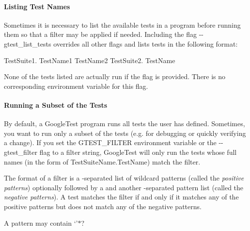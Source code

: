 \paragraph*{Listing Test Names}

Sometimes it is necessary to list the available tests in a program before running them so that a filter may be applied if needed. Including the flag {\ttfamily -\/-\/gtest\+\_\+list\+\_\+tests} overrides all other flags and lists tests in the following format\+:


\begin{DoxyCode}
TestSuite1.
  TestName1
  TestName2
TestSuite2.
  TestName
\end{DoxyCode}


None of the tests listed are actually run if the flag is provided. There is no corresponding environment variable for this flag.

\paragraph*{Running a Subset of the Tests}

By default, a Google\+Test program runs all tests the user has defined. Sometimes, you want to run only a subset of the tests (e.\+g. for debugging or quickly verifying a change). If you set the {\ttfamily G\+T\+E\+S\+T\+\_\+\+F\+I\+L\+T\+ER} environment variable or the {\ttfamily -\/-\/gtest\+\_\+filter} flag to a filter string, Google\+Test will only run the tests whose full names (in the form of {\ttfamily Test\+Suite\+Name.\+Test\+Name}) match the filter.

The format of a filter is a \textquotesingle{}{\ttfamily \+:}\textquotesingle{}-\/separated list of wildcard patterns (called the {\itshape positive patterns}) optionally followed by a \textquotesingle{}{\ttfamily -\/}\textquotesingle{} and another \textquotesingle{}{\ttfamily \+:}\textquotesingle{}-\/separated pattern list (called the {\itshape negative patterns}). A test matches the filter if and only if it matches any of the positive patterns but does not match any of the negative patterns.

A pattern may contain `'$\ast$\textquotesingle{}?

